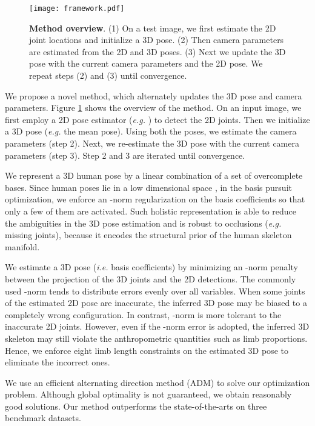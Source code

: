 \documentclass[10pt,twocolumn,letterpaper]{article}
\begin{document}
\begin{figure}
\centering
\texttt{[image: framework.pdf]}
\caption{\textbf{Method overview}. (1) On a test image, we first estimate the 2D joint locations and initialize a 3D pose. (2) Then camera parameters are estimated from the 2D and 3D poses. (3) Next we update the 3D pose with the current camera parameters and the 2D pose. We repeat steps (2) and (3) until convergence.}
\label{fig:framework}
\end{figure}

We propose a novel method, which alternately updates the 3D pose and camera parameters. Figure \ref{fig:framework} shows the overview of the method. On an input image, we first employ a 2D pose estimator ({\it e.g.} \cite{Yang2D}) to detect the 2D joints. Then we initialize a 3D pose ({\it e.g.} the mean pose). Using both the poses, we estimate the camera parameters (step 2). Next, we re-estimate the 3D pose with the current camera parameters (step 3). Step 2 and 3 are iterated until convergence.

We represent a 3D human pose by a linear combination of a set of overcomplete bases. Since human poses lie in a low dimensional space \cite{elgammal2004inferring}, in the basis pursuit optimization, we enforce an -norm regularization on the basis coefficients so that only a few of them are activated. Such holistic representation is able to reduce the ambiguities in the 3D pose estimation and is robust to occlusions ({\it e.g.} missing joints), because it encodes the structural prior of the human skeleton manifold.

We estimate a 3D pose ({\em i.e.} basis coefficients) by minimizing an -norm penalty between the projection of the 3D joints and the 2D detections. The commonly used -norm tends to distribute errors evenly over all variables. When some joints of the estimated 2D pose are inaccurate, the inferred 3D pose may be biased to a completely wrong configuration. In contrast, -norm is more tolerant to the inaccurate 2D joints. However, even if the -norm error is adopted, the inferred 3D skeleton may still violate the anthropometric quantities such as limb proportions. Hence, we enforce eight limb length constraints on the estimated 3D pose to eliminate the incorrect ones.

We use an efficient alternating direction method (ADM) to solve our optimization problem. Although global optimality is not guaranteed, we obtain reasonably good solutions. Our method outperforms the state-of-the-arts on three benchmark datasets.
\end{document}
